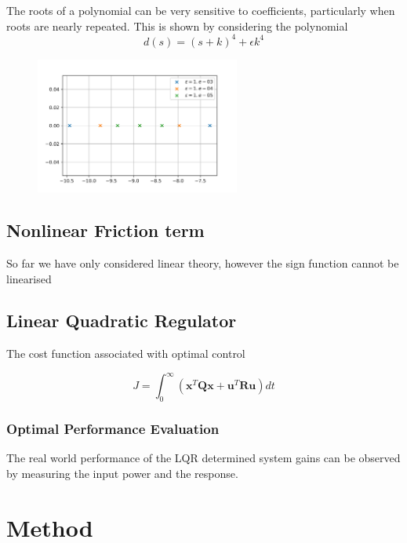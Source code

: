\documentclass{article}
\begin{document}
The roots of a polynomial can be very sensitive to coefficients, particularly when roots are nearly repeated.
This is shown by considering the polynomial
\begin{equation}
  d(s) = (s+k)^4 + \epsilon k^4
\end{equation}

\begin{figure}
  \centering
  \includegraphics[width=0.6\textwidth]{figures/pole_sensitivity.png}
  \caption{}
  \label{fig:pole_sensitivity}
\end{figure}

\subsection{Nonlinear Friction term}
So far we have only considered linear theory, however the sign function cannot be linearised

\subsection{Linear Quadratic Regulator}

The cost function associated with optimal control

\begin{equation}
  J = \int_0^\infty \left( \mathbf{x}^T \mathbf{Q} \mathbf{x} + \mathbf{u}^T \mathbf{R} \mathbf{u} \right) dt
\end{equation}

\subsubsection{Optimal Performance Evaluation}

The real world performance of the LQR determined system gains can be observed by measuring the input power and the response.

\section{Method}
\end{document}
